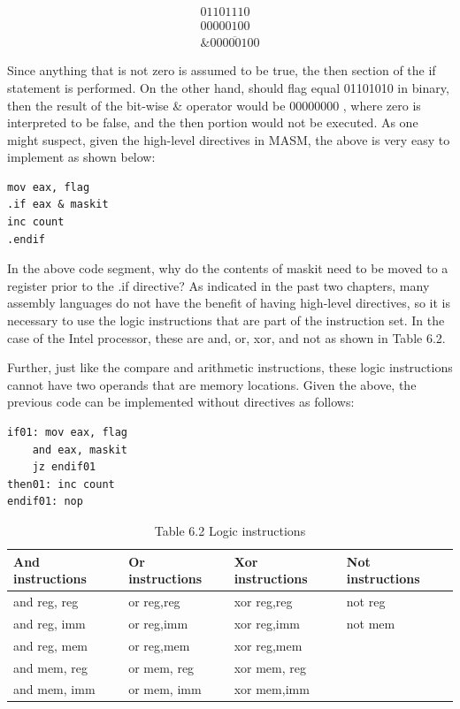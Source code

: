 \documentclass[10pt]{article}
\begin{document}
$$
\begin{array}{r}
01101110 \\
00000100 \\
\& \overline{00000100}
\end{array}
$$

Since anything that is not zero is assumed to be true, the then section of the if statement is performed. On the other hand, should flag equal 01101010 in binary, then the result of the bit-wise \& operator would be 00000000 , where zero is interpreted to be false, and the then portion would not be executed. As one might suspect, given the high-level directives in MASM, the above is very easy to implement as shown below:

\begin{verbatim}
mov eax, flag
.if eax & maskit
inc count
.endif
\end{verbatim}

In the above code segment, why do the contents of maskit need to be moved to a register prior to the .if directive? As indicated in the past two chapters, many assembly languages do not have the benefit of having high-level directives, so it is necessary to use the logic instructions that are part of the instruction set. In the case of the Intel processor, these are and, or, xor, and not as shown in Table 6.2.

Further, just like the compare and arithmetic instructions, these logic instructions cannot have two operands that are memory locations. Given the above, the previous code can be implemented without directives as follows:

\begin{verbatim}
if01: mov eax, flag
    and eax, maskit
    jz endif01
then01: inc count
endif01: nop
\end{verbatim}

\begin{table}[h]
\begin{center}
\captionsetup{labelformat=empty}
\caption{Table 6.2 Logic instructions}
\begin{tabular}{|l|l|l|l|}
\hline
And instructions & Or instructions & Xor instructions & Not instructions \\
\hline
and reg, reg & or reg,reg & xor reg,reg & not reg \\
\hline
and reg, imm & or reg,imm & xor reg,imm & not mem \\
\hline
and reg, mem & or reg,mem & xor reg,mem &  \\
\hline
and mem, reg & or mem, reg & xor mem, reg &  \\
\hline
and mem, imm & or mem, imm & xor mem,imm &  \\
\hline
\end{tabular}
\end{center}
\end{table}
\end{document}
